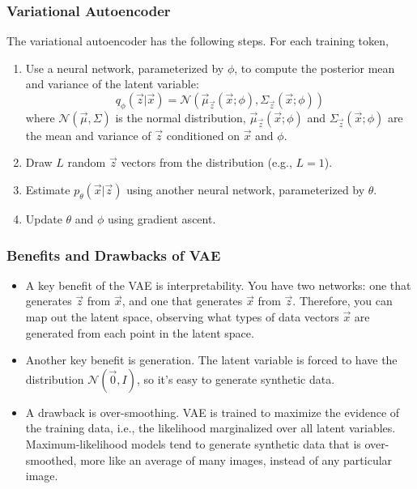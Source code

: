 \documentclass{beamer}
\begin{document}
\begin{frame}
  \frametitle{Variational Autoencoder}

  The variational autoencoder has the following steps.
  For each training token,
  \begin{enumerate}
  \item Use a neural network, parameterized by $\phi$, to compute the
    posterior mean and variance of the latent variable:
    \begin{displaymath}
      q_\phi(\vec{z}|\vec{x})=
      {\mathcal N}\left(\vec\mu_{\vec{z}}(\vec{x};\phi),\Sigma_{\vec{z}}(\vec{x};\phi)\right)
    \end{displaymath}
    where ${\mathcal N}(\vec\mu,\Sigma)$ is the normal distribution,
    $\vec\mu_{\vec{z}}(\vec{x};\phi)$ and
    $\Sigma_{\vec{z}}(\vec{x};\phi)$ are the mean and variance
    of $\vec{z}$ conditioned on $\vec{x}$ and $\phi$.
  \item Draw $L$ random $\vec{z}$ vectors from the distribution (e.g.,
    $L=1$).
  \item Estimate $p_\theta(\vec{x}|\vec{z})$ using another neural network,
    parameterized by $\theta$.
  \item Update $\theta$ and  $\phi$ using gradient ascent.
  \end{enumerate}
\end{frame}

\begin{frame}
  \frametitle{Benefits and Drawbacks of VAE}

  \begin{itemize}
  \item A key benefit of the VAE is interpretability.  You have two
    networks: one that generates $\vec{z}$ from $\vec{x}$, and one
    that generates $\vec{x}$ from $\vec{z}$.  Therefore, you can map
    out the latent space, observing what types of data vectors
    $\vec{x}$ are generated from each point in the latent space.
  \item Another key benefit is generation.  The latent variable is
    forced to have the distribution ${\mathcal N}(\vec{0},I)$, so it's
    easy to generate synthetic data.
  \item A drawback is over-smoothing.  VAE is trained to maximize the
    evidence of the training data, i.e., the likelihood marginalized
    over all latent variables.  Maximum-likelihood models tend to
    generate synthetic data that is over-smoothed, more like an
    average of many images, instead of any particular image.
  \end{itemize}
\end{frame}
\end{document}

